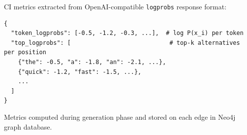 CI metrics extracted from OpenAI-compatible \texttt{logprobs} response format:

\begin{verbatim}
{
  "token_logprobs": [-0.5, -1.2, -0.3, ...],  # log P(x_i) per token
  "top_logprobs": [                            # top-k alternatives per position
    {"the": -0.5, "a": -1.8, "an": -2.1, ...},
    {"quick": -1.2, "fast": -1.5, ...},
    ...
  ]
}
\end{verbatim}

Metrics computed during generation phase and stored on each edge in Neo4j graph database.












